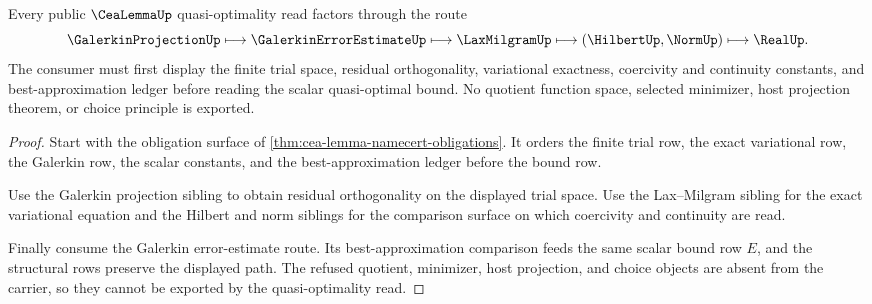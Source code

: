 \begin{theorem}
\label{thm:cea-lemma-quasi-optimal-projection-route}
Every public $\CeaLemmaUp$ quasi-optimality read factors through the route
$$
\GalerkinProjectionUp \longmapsto \GalerkinErrorEstimateUp \longmapsto \LaxMilgramUp \longmapsto (\HilbertUp,\NormUp) \longmapsto \RealUp .
$$
The consumer must first display the finite trial space, residual orthogonality, variational exactness, coercivity and continuity constants, and best-approximation ledger before reading the scalar quasi-optimal bound. No quotient function space, selected minimizer, host projection theorem, or choice principle is exported.
\end{theorem}
\begin{proof}
Start with the obligation surface of \autoref{thm:cea-lemma-namecert-obligations}. It orders the finite trial row, the exact variational row, the Galerkin row, the scalar constants, and the best-approximation ledger before the bound row.

Use the Galerkin projection sibling to obtain residual orthogonality on the displayed trial space. Use the Lax--Milgram sibling for the exact variational equation and the Hilbert and norm siblings for the comparison surface on which coercivity and continuity are read.

Finally consume the Galerkin error-estimate route. Its best-approximation comparison feeds the same scalar bound row $E$, and the structural rows preserve the displayed path. The refused quotient, minimizer, host projection, and choice objects are absent from the carrier, so they cannot be exported by the quasi-optimality read.
\end{proof}


\begin{closurestatus}{\CeaLemmaUp}
  \theoryclosure{\seedClosure}
  \formalstatus{\unformalizedV}
\end{closurestatus}
